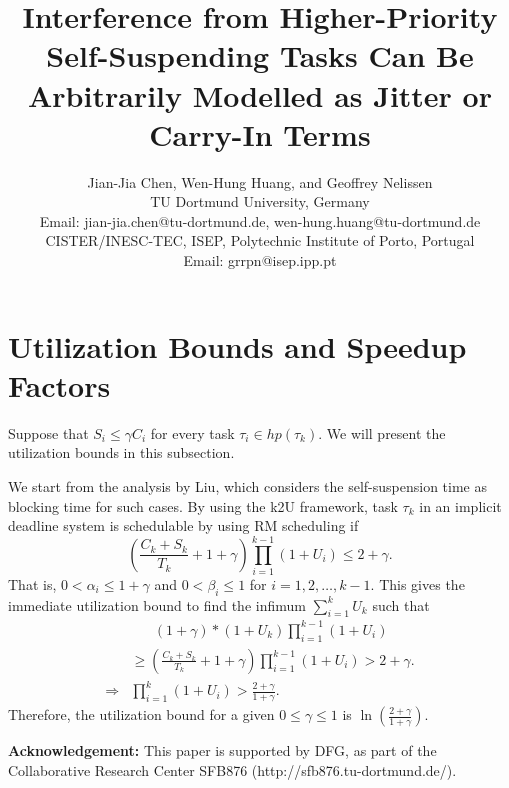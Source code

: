 \documentclass[10pt,conference,preprint]{IEEEtran}
\begin{document}
\title{\LARGE Interference from Higher-Priority Self-Suspending Tasks Can Be
  Arbitrarily Modelled as Jitter or Carry-In Terms}

\author{Jian-Jia Chen, Wen-Hung Huang, and Geoffrey Nelissen\\
TU Dortmund University, Germany\\
Email: jian-jia.chen@tu-dortmund.de, wen-hung.huang@tu-dortmund.de\\
CISTER/INESC-TEC, ISEP, Polytechnic Institute of Porto, Portugal \\
Email: grrpn@isep.ipp.pt
}

\maketitle

\begin{abstract}
  
\end{abstract}























\section{Utilization Bounds and Speedup Factors}
Suppose that $S_i \leq \gamma C_i$ for every task $\tau_i \in hp(\tau_k)$. We will present the utilization bounds in this subsection. 

We start from the analysis by Liu, which considers the self-suspension time as blocking time for such cases.
By using the k2U framework, task $\tau_k$ in an implicit deadline system is schedulable by using RM scheduling if
\[
(\frac{C_k + S_k}{ T_k}+1+\gamma) \prod_{i=1}^{k-1}(1+U_i) \leq 2+\gamma.
\]
That is, $0 < \alpha_i \leq  1+\gamma$ and $0 < \beta_i \leq 1$ for $i=1,2,\ldots,k-1$.
This gives the immediate utilization bound to find the infimum $\sum_{i=1}^{k} U_k$ such that
\begin{align*}
&\;\;\;\;\;\; (1+\gamma)*(1+U_k) \prod_{i=1}^{k-1}(1+U_i) \\
&\geq (\frac{C_k + S_k}{ T_k}+1+\gamma) \prod_{i=1}^{k-1}(1+U_i) > 2+\gamma.\\
\Rightarrow & \prod_{i=1}^{k}(1+U_i) > \frac{2+\gamma}{1+\gamma}.
\end{align*}
Therefore, the utilization bound for a given $0 \leq \gamma \leq 1$  is $\ln(\frac{2+\gamma}{1+\gamma})$.











{\bf Acknowledgement:} This paper is supported by DFG, as part of the Collaborative Research Center SFB876 (http://sfb876.tu-dortmund.de/).

{}
\end{document}
